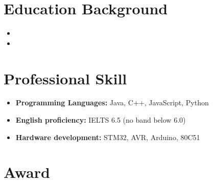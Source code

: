 \documentclass[11pt,a4paper,sans]{moderncv}
\begin{document}
\makecvtitle


\section{Education Background}
\vspace{5pt}
\begin{itemize}
\item{}
\item{}
\end{itemize}

\section{Professional Skill}

\begin{itemize}
\item \textbf{Programming Languages: } Java, C++, JavaScript, Python
\vspace{4pt}

\item \textbf{English proficiency: } IELTS 6.5 (no band below 6.0)
\vspace{4pt}

\item \textbf{Hardware development:} STM32, AVR, Arduino, 80C51
\end{itemize}

\section{Award}
\end{document}
